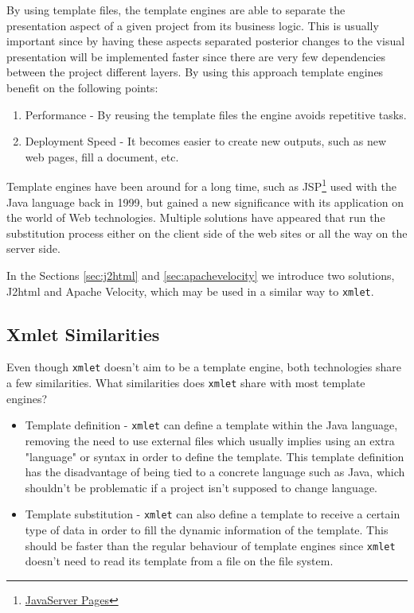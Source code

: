 \noindent
By using template files, the template engines are able to separate the presentation aspect of a given project from its business logic. This is usually important since by having these aspects separated posterior changes to the visual presentation will be implemented faster since there are very few dependencies between the project different layers. By using this approach template engines benefit on the following points:

\begin{enumerate}
\item Performance - By reusing the template files the engine avoids repetitive tasks.
\item Deployment Speed - It becomes easier to create new outputs, such as new web pages, fill a document, etc.
\end{enumerate}

\noindent
Template engines have been around for a long time, such as \ac{JSP}\footnote{\href{http://www.oracle.com/technetwork/java/javaee/jsp/index.html} {JavaServer Pages}} used with the Java language back in 1999, but gained a new significance with its application on the world of Web technologies. Multiple solutions have appeared that run the substitution process either on the client side of the web sites or all the way on the server side. 

\noindent
In the Sections \ref{sec:j2html} and \ref{sec:apachevelocity} we introduce two solutions, J2html and Apache Velocity, which may be used in a similar way to \texttt{xmlet}.

\subsection{Xmlet Similarities}
\label{sec:similarities}

Even though \texttt{xmlet} doesn't aim to be a template engine, both technologies share a few similarities. What similarities does \texttt{xmlet} share with most template engines?

\begin{itemize}
	\item Template definition - \texttt{xmlet} can define a template within the Java language, removing the need to use external files which usually implies using an extra "language" or syntax in order to define the template. This template definition has the disadvantage of being tied to a concrete language such as Java, which shouldn't be problematic if a project isn't supposed to change language. 
	\item Template substitution - \texttt{xmlet} can also define a template to receive a certain type of data in order to fill the dynamic information of the template. This should be faster than the regular behaviour of template engines since \texttt{xmlet} doesn't need to read its template from a file on the file system.
\end{itemize}

